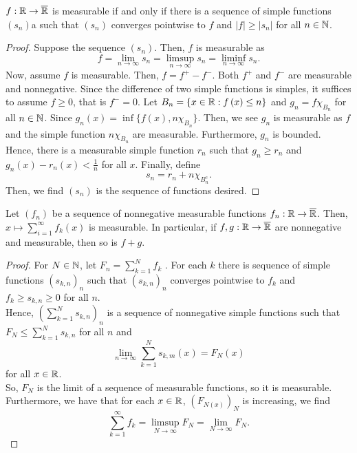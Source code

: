 \begin{theorem}
	\(f: \mathbb{R} \to \overline{\mathbb{R}}\)  is measurable if and only if there is a sequence of simple functions \(\left( s_{n} \right) \)a such that \(\left( s_{n} \right) \) converges pointwise to \(f\) and \(\left| f \right| \ge \left| s_{n} \right| \)   for all \(n \in \mathbb{N}\).
\end{theorem}
\begin{proof}
Suppose the sequence \(\left( s_{n} \right) \). Then, \(f\) is measurable as \[f = \lim_{n \to \infty}s_{n} = \limsup_{n \to \infty} s_{n} = \liminf_{n \to \infty} s_{n}.\]
Now, assume \(f\) is measurable. Then, \(f = f^{+} - f^{-}\). Both \(f^{+}\)  and \(f^{-}\)  are measurable and nonnegative. Since the difference of two simple functions is simples, it suffices to assume \(f\ge 0\), that is \(f^{-} = 0\). Let \(B_{n} = \{x \in \mathbb{R} : f\left( x \right) \le n\} \)  and \(g_{n} = f\chi_{B_{n}}\)  for all \(n \in \mathbb{N}\). Since \(g_{n}\left( x \right) = \inf \{ f\left( x \right), n\chi_{B_{n}}  \} \). Then, we see \(g_{n}\) is measurable as \(f\)  and the simple function \(n\chi_{B_{n}}\)  are measurable. Furthermore, \(g_{n}\) is bounded. Hence, there is a measurable simple function \(r_{n}\) such that \(g_{n} \ge r_{n}\)  and \(g_{n}(x) - r_{n}(x) < \frac{1}{n}\) for all \(x\). Finally, define \[
s_{n} = r_{n} + n\chi_{B_{n}^{c}}
.\]
Then, we find \(\left( s_{n} \right) \)  is the sequence of functions desired.
\end{proof}
\begin{corollary}
	Let \(\left( f_{n} \right) \) be a sequence of nonnegative measurable functions \(f_{n}:\mathbb{R}  \to\overline{\mathbb{R}} \). Then, \(x \mapsto \sum_{i= 1}^{\infty} f_{k}\left( x \right) \)  is measurable. In particular, if \(f, g: \mathbb{R} \to \overline{\mathbb{R}}\) are nonnegative and measurable, then so is \(f + g\).
\end{corollary}
\begin{proof}
	For \(N \in \mathbb{N}\), let \(F_{n} = \sum_{k=1}^{N} f_{k}\) . For each \(k\) there is  sequence of simple functions \(\left( s_{k, n} \right) _{n}\)  such that \(\left( s_{k, n} \right) _{n}\) converges pointwise to \(f_{k}\)  and \(f_{k} \ge s_{k, n} \ge 0\)  for all \(n\).\\
	Hence, \(\left( \sum_{k=1}^{N} s_{k, n} \right)_{n} \)  is a sequence of nonnegative simple functions such that \(F_{N} \le \sum_{k=1}^{N} s_{k, n}\)  for all \(n\)  and \[
		\lim_{n \to \infty}\sum_{k=1}^{N} s_{k, m}\left( x \right)  = F_{N}\left( x \right)
	\] for all \(x \in \mathbb{R}\).\\
	So, \(F_{N}\) is the limit of a sequence of measurable functions, so it is measurable. Furthermore, we have that for each \(x \in \mathbb{R}\), \(\left( F_{N\left( x \right) } \right) _{N}\)  is increasing, we find \[
		\sum_{k=1}^{\infty} f_{k} = \limsup_{N \to \infty} F_{N} = \lim_{N \to \infty}F_{N}
	.\]

\end{proof}
